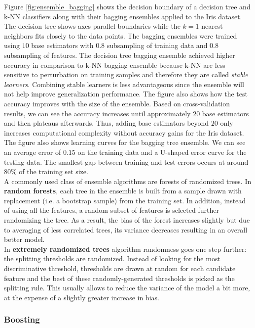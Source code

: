 Figure \ref{fig:ensemble_bagging} shows the decision boundary of a decision tree and k-NN classifiers along with their bagging ensembles applied to the Iris dataset. The decision tree shows axes parallel boundaries while the $k=1$ nearest neighbors fits closely to the data points. The bagging ensembles were trained using $10$ base estimators with $0.8$ subsampling of training data and $0.8$ subsampling of features. The decision tree bagging ensemble achieved higher accuracy in comparison to k-NN bagging ensemble because k-NN are less sensitive to perturbation on training samples and therefore they are called \textit{stable learners}. Combining stable learners is less advantageous since the ensemble will not help improve generalization performance. The figure also shows how the test accuracy improves with the size of the ensemble. Based on cross-validation results, we can see the accuracy increases until approximately $20$ base estimators and then plateaus afterwards. Thus, adding base estimators beyond $20$ only increases computational complexity without accuracy gains for the Iris dataset. The figure also shows learning curves for the bagging tree ensemble. We can see an average error of $0.15$ on the training data and a U-shaped error curve for the testing data. The smallest gap between training and test errors occurs at around $80\%$ of the training set size.\\

A commonly used class of ensemble algorithms are forests of randomized trees. In \textbf{random forests}, each tree in the ensemble is built from a sample drawn with replacement (i.e. a bootstrap sample) from the training set. In addition, instead of using all the features, a random subset of features is selected further randomizing the tree. As a result, the bias of the forest increases slightly but due to averaging of less correlated trees, its variance decreases resulting in an overall better model.\\

In \textbf{extremely randomized trees} algorithm randomness goes one step further: the splitting thresholds are randomized. Instead of looking for the most discriminative threshold, thresholds are drawn at random for each candidate feature and the best of these randomly-generated thresholds is picked as the splitting rule. This usually allows to reduce the variance of the model a bit more, at the expense of a slightly greater increase in bias.\\  


\subsubsection{Boosting}

